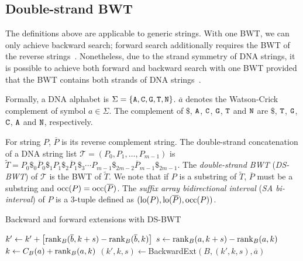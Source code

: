 \documentclass[webpdf,contemporary,large,namedate]{oup-authoring-template}%
\begin{document}
\subsection{Double-strand BWT}\label{sec:ds-bwt}

The definitions above are applicable to generic strings.
With one BWT, we can only achieve backward search;
forward search additionally requires the BWT of the reverse strings~\citep{DBLP:conf/bibm/LamLTWWY09}.
Nonetheless, due to the strand symmetry of DNA strings,
it is possible to achieve both forward and backward search with one BWT provided that the BWT contains both strands of DNA strings~\citep{Li:2012fk}.

Formally, a DNA alphabet is $\Sigma=\{{\tt A},{\tt C},{\tt G},{\tt T},{\tt N}\}$.
$\overline{a}$ denotes the Watson-Crick complement of symbol $a\in\Sigma$.
The complement of $\$$, ${\tt A}$, ${\tt C}$, ${\tt G}$, ${\tt T}$ and ${\tt N}$
are $\$$, ${\tt T}$, ${\tt G}$, ${\tt C}$, ${\tt A}$ and ${\tt N}$, respectively.

For string $P$, $\overline{P}$ is its reverse complement string.
The double-strand concatenation of a DNA string list $\mathcal{T}=(P_0,P_1,\ldots,P_{m-1})$ is
$\tilde{T}=P_0\$_0\overline{P}_0\$_1P_1\$_2\overline{P}_1\$_3\cdots P_{m-1}\$_{2m-2}\overline{P}_{m-1}\$_{2m-1}$.
The \emph{double-strand BWT} (\emph{DS-BWT}) of $\mathcal{T}$ is the BWT of $\tilde{T}$.
We note that if $P$ is a substring of $\tilde{T}$,
$\overline{P}$ must be a substring and ${\rm occ}(P)={\rm occ}(\overline{P})$.
The \emph{suffix array bidirectional interval} (\emph{SA bi-interval}) of $P$ is a 3-tuple defined as $({\rm lo}(P),{\rm lo}(\overline{P}),{\rm occ}(P))$.

\begin{algorithm}[tb]
	\caption{Backward and forward extensions with DS-BWT}\label{algo:backfor}
	\begin{algorithmic}[1]
				\State $k'\gets k'+\big[{\rm rank}_B(\overline{b},k+s)-{\rm rank}_B(\overline{b},k)\big]$
			\EndFor
			\State $s\gets {\rm rank}_B(a,k+s)-{\rm rank}_B(a,k)$
			\State $k\gets C_B(a)+{\rm rank}_B(a,k)$
			\State {}
		\EndProcedure
			\State $(k',k,s)\gets${\sc BackwardExt}$(B,(k',k,s),\overline{a})$
			\State {}
		\EndProcedure
	\end{algorithmic}
\end{algorithm}
\end{document}
